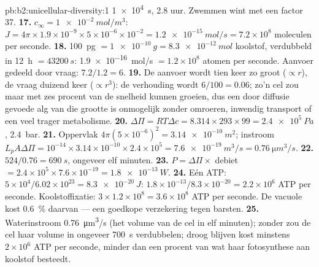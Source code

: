 \begin{solution}{pb:b2:unicellular-diversity:1}
\qty{1e4}{s}, 2.8 uur. Zwemmen wint met een factor 37.
\textbf{17.} $c_\infty = \qty{1e-2}{mol/m^3}$: $J = 4\pi\times
1.9\times 10^{-9}\times 5\times 10^{-6}\times 10^{-2} =
\qty{1.2e-15}{mol/s} = 7.2\times 10^8$ moleculen per seconde.
\textbf{18.} \qty{100}{pg} $= \qty{1e-10}{g} = \qty{8.3e-12}{mol}$
koolstof, verdubbeld in \qty{12}{h} $= \qty{43200}{s}$:
\qty{1.9e-16}{mol/s} $= 1.2\times 10^8$ atomen per seconde. Aanvoer
gedeeld door vraag: $7.2/1.2 = 6$.
\textbf{19.} De aanvoer wordt tien keer zo groot ($\propto r$), de vraag
duizend keer ($\propto r^3$): de verhouding wordt $6/100 = 0.06$; zo'n
cel zou maar met zes procent van de snelheid kunnen groeien, dus een door
diffusie gevoede alg van die grootte is onmogelijk zonder omroeren,
inwendig transport of een veel trager metabolisme.
\textbf{20.} $\Delta\Pi = RT\Delta c = 8.314\times 293\times 99 =
\qty{2.4e5}{Pa}$, \qty{2.4}{bar}.
\textbf{21.} Oppervlak $4\pi(5\times 10^{-6})^2 = \qty{3.14e-10}{m^2}$;
instroom $L_p A\Delta\Pi = 10^{-14}\times 3.14\times 10^{-10}\times
2.4\times 10^5 = \qty{7.6e-19}{m^3/s} = \qty{0.76}{\micro m^3/s}$.
\textbf{22.} $524/0.76 = \qty{690}{s}$, ongeveer elf minuten.
\textbf{23.} $P = \Delta\Pi\times$ debiet $= 2.4\times 10^5\times
7.6\times 10^{-19} = \qty{1.8e-13}{W}$.
\textbf{24.} Eén ATP: $5\times 10^4/6.02\times 10^{23} =
\qty{8.3e-20}{J}$: $1.8\times 10^{-13}/8.3\times 10^{-20} = 2.2\times
10^6$ ATP per seconde. Koolstoffixatie: $3\times 1.2\times 10^8 =
3.6\times 10^8$ ATP per seconde. De vacuole kost \qty{0.6}{\%} daarvan
--- een goedkope verzekering tegen barsten.
\textbf{25.} Waterinstroom \qty{0.76}{\micro m^3/s} (het volume van de
cel in elf minuten); zonder  zou de cel haar volume in
ongeveer \qty{700}{s} verdubbelen; droog blijven kost minstens
$2\times 10^6$ ATP per seconde, minder dan een procent van wat haar
fotosynthese aan koolstof besteedt.
\end{solution}
